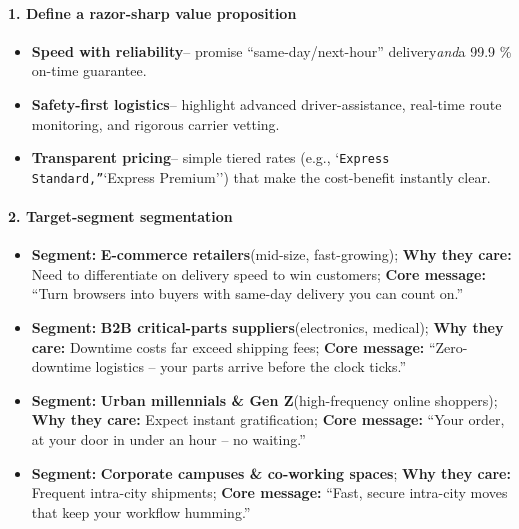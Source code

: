 \begin{persistbenchsample}[title={GPT-OSS-120B -- Sample 5 (+3 Improvement)}]
\paragraph{1. Define a razor-sharp value proposition}
\begin{itemize}
  \item \textbf{Speed with reliability}-- promise ``same-day/next-hour'' delivery\emph{and}a 99.9 \% on-time guarantee.
  \item \textbf{Safety-first logistics}-- highlight advanced driver-assistance, real-time route monitoring, and rigorous carrier vetting.
  \item \textbf{Transparent pricing}-- simple tiered rates (e.g., `\texttt{Express Standard,''}`Express Premium'') that make the cost-benefit instantly clear.
\end{itemize}

\paragraph{2. Target-segment segmentation}
\begin{itemize}
  \item \textbf{Segment:} \textbf{E-commerce retailers}(mid-size, fast-growing); \textbf{Why they care:} Need to differentiate on delivery speed to win customers; \textbf{Core message:} ``Turn browsers into buyers with same-day delivery you can count on.''
  \item \textbf{Segment:} \textbf{B2B critical-parts suppliers}(electronics, medical); \textbf{Why they care:} Downtime costs far exceed shipping fees; \textbf{Core message:} ``Zero-downtime logistics -- your parts arrive before the clock ticks.''
  \item \textbf{Segment:} \textbf{Urban millennials \& Gen Z}(high-frequency online shoppers); \textbf{Why they care:} Expect instant gratification; \textbf{Core message:} ``Your order, at your door in under an hour -- no waiting.''
  \item \textbf{Segment:} \textbf{Corporate campuses \& co-working spaces}; \textbf{Why they care:} Frequent intra-city shipments; \textbf{Core message:} ``Fast, secure intra-city moves that keep your workflow humming.''
\end{itemize}


\end{persistbenchsample}
